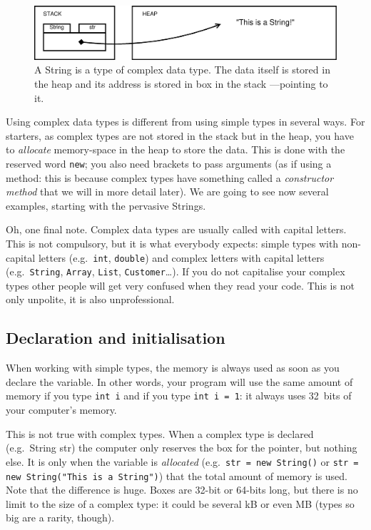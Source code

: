 \begin{figure}[htbp]
  \centering
  \includegraphics[width=\textwidth]{gfx/variables-string}
  \caption{A String is a type of complex data type. The data itself is
    stored in the heap and its address is stored in box in the stack
    ---pointing to it. }
  \label{fig:compledata}
\end{figure}

Using complex data types is different from using simple types in
several ways. For starters, as complex types are not stored in the
stack but in the heap, you have to \emph{allocate} memory-space in the
heap to store the data. This is done with the reserved word
\verb+new+; you also need brackets to pass arguments (as if using a
method: this is because complex types have something called a
\emph{constructor method} that we will in more detail later). We are
going to see now several examples, starting with the pervasive
Strings. 

Oh, one final note. Complex data types are usually called with capital
letters. This is not compulsory, but it is what everybody expects:
simple types with non-capital letters (e.g.~\verb+int+, \verb+double+)
and complex letters with capital letters (e.g.~\verb+String+,
\verb+Array+, \verb+List+, \verb+Customer+\ldots). If you do not
capitalise your complex types other people will get very confused when
they read your code. This is not only unpolite, it is also
unprofessional. 

\subsection{Declaration and initialisation}
\label{sec:decl-init}

When working with simple types, the memory is always used as soon as
you declare the variable. In other words, your program will use the
same amount of memory if you type \verb+int i+ and if you type
\verb+int i = 1+: it always uses 32~bits of your computer's memory. 

This is not true with complex types. When a complex type is declared
(e.g.~String str) the computer only reserves the box for the pointer,
but nothing else. It is only when the variable is \emph{allocated}
(e.g.~\verb+str = new String()+ 
or \verb+str = new String("This is a String")+) that the total amount
of memory is used. Note that the difference is huge. Boxes are 32-bit
or 64-bits long, but there is no limit to the size of a complex type:
it could be several kB or even MB (types so big are a rarity,
though). 

